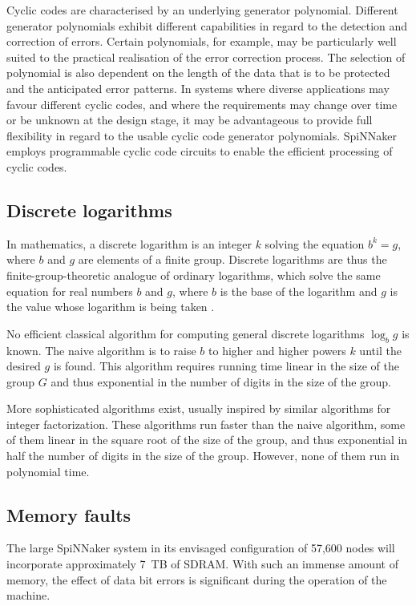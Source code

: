 \documentclass[a4paper, 11pt]{article}
\begin{document}
Cyclic codes are characterised by an underlying generator polynomial. Different generator polynomials exhibit different capabilities in regard to the detection and correction of errors. Certain polynomials, for example, may be particularly well suited to the practical realisation of the error correction process. The selection of polynomial is also dependent on the length of the data that is to be protected and the anticipated error patterns. In systems where diverse applications may favour different cyclic codes, and where the requirements may change over time or be unknown at the design stage, it may be advantageous to provide full flexibility in regard to the usable cyclic code generator polynomials. SpiNNaker employs programmable cyclic code circuits to enable the efficient processing of cyclic codes.

\subsection{Discrete logarithms}
In mathematics, a discrete logarithm is an integer $k$ solving the equation $b^k = g$, where $b$ and $g$ are elements of a finite group. Discrete logarithms are thus the finite-group-theoretic analogue of ordinary logarithms, which solve the same equation for real numbers $b$ and $g$, where $b$ is the base of the logarithm and $g$ is the value whose logarithm is being taken \citep{wiki:discretelogs}.

No efficient classical algorithm for computing general discrete logarithms $\log _b g$ is known. The naive algorithm is to raise $b$ to higher and higher powers $k$ until the desired $g$ is found. This algorithm requires running time linear in the size of the group $G$ and thus exponential in the number of digits in the size of the group.

More sophisticated algorithms exist, usually inspired by similar algorithms for integer factorization. These algorithms run faster than the naive algorithm, some of them linear in the square root of the size of the group, and thus exponential in half the number of digits in the size of the group. However, none of them run in polynomial time.

\subsection{Memory faults}
The large SpiNNaker system in its envisaged configuration of 57,600 nodes will incorporate approximately 7~TB of SDRAM. With such an immense amount of memory, the effect of data bit errors is significant during the operation of the machine.
\end{document}
